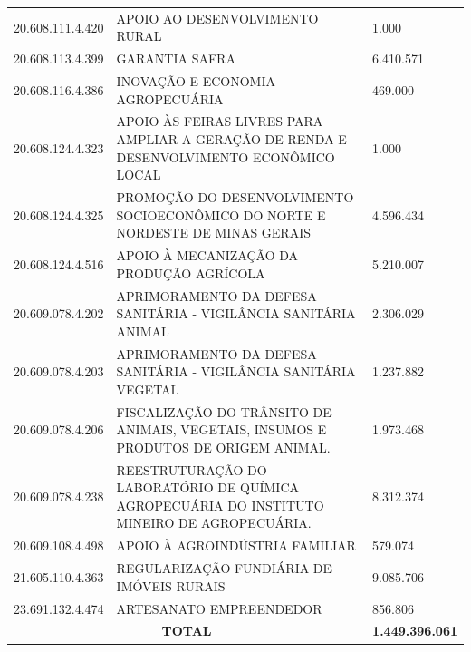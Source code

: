 \documentclass{article}
\begin{document}
\begin{longtable}[c]{m{3cm}|m{12cm}|m{2cm}}
\multicolumn{1}{C{3cm}|}{20.608.111.4.420} & \multicolumn{1}{L{12cm}|}{APOIO AO DESENVOLVIMENTO RURAL} & \multicolumn{1}{R{2cm}}{1.000} \\
\multicolumn{1}{C{3cm}|}{20.608.113.4.399} & \multicolumn{1}{L{12cm}|}{GARANTIA SAFRA} & \multicolumn{1}{R{2cm}}{6.410.571} \\
\multicolumn{1}{C{3cm}|}{20.608.116.4.386} & \multicolumn{1}{L{12cm}|}{INOVAÇÃO E ECONOMIA AGROPECUÁRIA} & \multicolumn{1}{R{2cm}}{469.000} \\
\multicolumn{1}{C{3cm}|}{20.608.124.4.323} & \multicolumn{1}{L{12cm}|}{APOIO ÀS FEIRAS LIVRES PARA AMPLIAR A GERAÇÃO DE RENDA E DESENVOLVIMENTO ECONÔMICO LOCAL} & \multicolumn{1}{R{2cm}}{1.000} \\
\multicolumn{1}{C{3cm}|}{20.608.124.4.325} & \multicolumn{1}{L{12cm}|}{PROMOÇÃO DO DESENVOLVIMENTO SOCIOECONÔMICO DO NORTE E NORDESTE DE MINAS GERAIS} & \multicolumn{1}{R{2cm}}{4.596.434} \\
\multicolumn{1}{C{3cm}|}{20.608.124.4.516} & \multicolumn{1}{L{12cm}|}{APOIO À MECANIZAÇÃO DA PRODUÇÃO AGRÍCOLA} & \multicolumn{1}{R{2cm}}{5.210.007} \\
\multicolumn{1}{C{3cm}|}{20.609.078.4.202} & \multicolumn{1}{L{12cm}|}{APRIMORAMENTO DA DEFESA SANITÁRIA - VIGILÂNCIA SANITÁRIA ANIMAL} & \multicolumn{1}{R{2cm}}{2.306.029} \\
\multicolumn{1}{C{3cm}|}{20.609.078.4.203} & \multicolumn{1}{L{12cm}|}{APRIMORAMENTO DA DEFESA SANITÁRIA - VIGILÂNCIA SANITÁRIA VEGETAL} & \multicolumn{1}{R{2cm}}{1.237.882} \\
\multicolumn{1}{C{3cm}|}{20.609.078.4.206} & \multicolumn{1}{L{12cm}|}{FISCALIZAÇÃO DO TRÂNSITO DE ANIMAIS, VEGETAIS, INSUMOS E PRODUTOS DE ORIGEM ANIMAL.} & \multicolumn{1}{R{2cm}}{1.973.468} \\
\multicolumn{1}{C{3cm}|}{20.609.078.4.238} & \multicolumn{1}{L{12cm}|}{REESTRUTURAÇÃO DO LABORATÓRIO DE QUÍMICA AGROPECUÁRIA DO INSTITUTO MINEIRO DE AGROPECUÁRIA.} & \multicolumn{1}{R{2cm}}{8.312.374} \\
\multicolumn{1}{C{3cm}|}{20.609.108.4.498} & \multicolumn{1}{L{12cm}|}{APOIO À AGROINDÚSTRIA FAMILIAR} & \multicolumn{1}{R{2cm}}{579.074} \\
\multicolumn{1}{C{3cm}|}{21.605.110.4.363} & \multicolumn{1}{L{12cm}|}{REGULARIZAÇÃO FUNDIÁRIA DE IMÓVEIS RURAIS} & \multicolumn{1}{R{2cm}}{9.085.706} \\
\multicolumn{1}{C{3cm}|}{23.691.132.4.474} & \multicolumn{1}{L{12cm}|}{ARTESANATO EMPREENDEDOR} & \multicolumn{1}{R{2cm}}{856.806} \\
\hline\hline
\multicolumn{2}{c|}{ \textbf{TOTAL}} & \multicolumn{1}{R{2cm}}{ \textbf{1.449.396.061}} \\\hline\hline\end{longtable}
\end{document}
